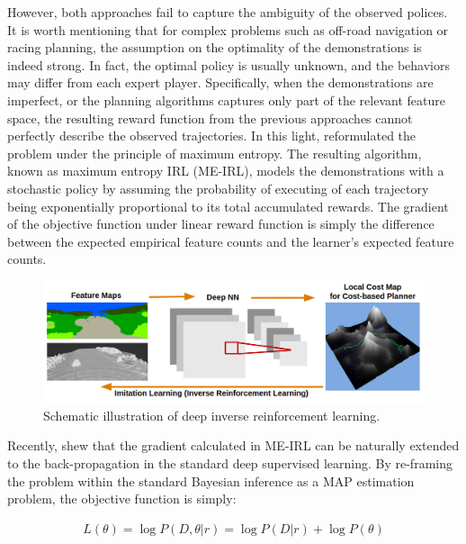 \documentclass[../thesis.tex]{subfiles}
\begin{document}
However, both approaches fail to capture the ambiguity of the observed polices.
It is worth mentioning that for complex problems such as off-road navigation or racing planning, the assumption on the optimality of the demonstrations is indeed strong. In fact, the optimal policy is usually unknown, and the behaviors may differ from each expert player.
Specifically, when the demonstrations are imperfect, or the planning algorithms captures only part of the relevant feature space, the resulting reward function from the previous approaches cannot perfectly describe the observed trajectories.
In this light, \citet{ziebart2008maximum} reformulated the problem under the principle of maximum entropy.
The resulting algorithm, known as maximum entropy IRL (ME-IRL), models the demonstrations with a stochastic policy by assuming the probability of executing of each trajectory being exponentially proportional to its total accumulated rewards.
The gradient of the objective function under linear reward function is simply the difference between the expected empirical feature counts and the learner's expected feature counts.
 
 
 
\begin{figure}[t]
      \begin{center}
       \centerline{\includegraphics[width=0.9\columnwidth]{./DIRL/fig/dirl_pipeline.png}}
            \caption{Schematic illustration of deep inverse reinforcement learning.}
            \label{fig:dirl_diagram}
      \end{center}
\end{figure}
 
Recently, \citet{wulfmeier2015maximum} shew that the gradient calculated in ME-IRL can be naturally extended to the back-propagation in the standard deep supervised learning.
By re-framing the problem within the standard Bayesian inference as a MAP estimation problem, the objective function is simply:
 
\begin{align}
L(\theta) = \log P(D,\theta|r) = \log P(D|r) + \log P(\theta) \label{equ:dirl_obj}
\end{align}
 
\end{document}
